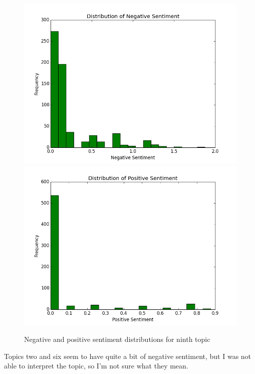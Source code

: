 \documentclass{article}
\begin{document}
\begin{enumerate}
		\begin{figure}[H]
			\includegraphics[scale=0.35]{8neg.png}
			\includegraphics[scale=0.35]{8pos.png}
			\begin{center}
			\caption{Negative and positive sentiment distributions for ninth topic}
			\end{center}
		\end{figure}
		Topics two and six seem to have quite a bit of negative sentiment, but I was not able to interpret the topic, so I'm not sure what they mean.
		\begin{figure}[H]

\end{figure}
\end{enumerate}
\end{document}
